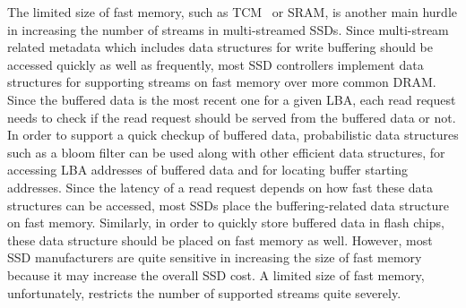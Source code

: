 The limited size of fast memory, such as TCM~\cite{TCM} or SRAM, is another
main hurdle in increasing the number of streams in multi-streamed SSDs.  Since
multi-stream related metadata which includes data structures for write
buffering should be accessed quickly as well as frequently, most SSD
controllers implement data structures for supporting streams on fast memory
over more common DRAM.  Since the buffered data is the most recent one for a
given LBA, each read request needs to check if the read request should be
served from the buffered data or not.  In order to support a quick checkup of
buffered data, probabilistic data structures such as a bloom filter can be used
along with other efficient data structures, for accessing LBA addresses of
buffered data and for locating buffer starting addresses.   Since the latency
of a read request depends on how fast these data structures can be accessed,
most SSDs place the buffering-related data structure on fast memory.
Similarly, in order to quickly store buffered data in flash chips, these data
structure should be placed on fast memory as well.  However, most SSD
manufacturers are quite sensitive in increasing the size of fast memory because
it may increase the overall SSD cost.   A limited size of fast memory,
unfortunately, restricts the number of supported streams quite severely.

